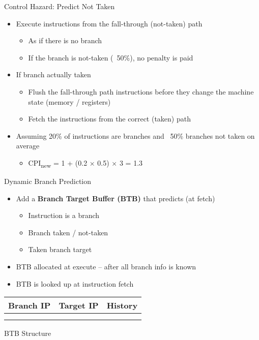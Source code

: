 \documentclass[aspectratio=169,12pt]{beamer}
\begin{document}
\begin{frame}{Control Hazard: Predict Not Taken}
    \begin{itemize}
        \item Execute instructions from the fall-through (not-taken) path
        \begin{itemize}
            \item As if there is no branch
            \item If the branch is not-taken (~50\%), no penalty is paid
        \end{itemize}
        \item If branch actually taken
        \begin{itemize}
            \item Flush the fall-through path instructions before they change the machine state (memory / registers)
            \item Fetch the instructions from the correct (taken) path
        \end{itemize}
        \item Assuming 20\% of instructions are branches and ~50\% branches not taken on average
        \begin{itemize}
            \item CPI\textsubscript{new} = 1 + (0.2 × 0.5) × 3 = 1.3
        \end{itemize}
    \end{itemize}
\end{frame}

\begin{frame}{Dynamic Branch Prediction}
    \begin{itemize}
        \item Add a \textbf{Branch Target Buffer (BTB)} that predicts (at fetch)
        \begin{itemize}
            \item Instruction is a branch
            \item Branch taken / not-taken
            \item Taken branch target
        \end{itemize}
        \item BTB allocated at execute – after all branch info is known
        \item BTB is looked up at instruction fetch
    \end{itemize}
    
    \centering
    \begin{tabular}{|c|c|c|}
        \hline
        Branch IP & Target IP & History\\
        \hline
        & & \\
        & & \\
        \hline
    \end{tabular}
    
    \vspace{0.5cm}
    BTB Structure
\end{frame}
\end{document}
